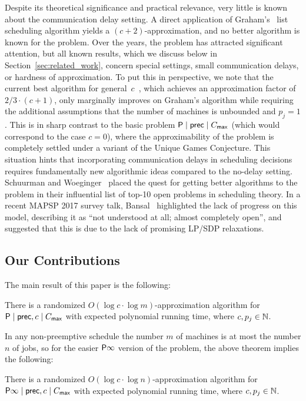Despite its theoretical significance and practical relevance, very little is known about the communication delay setting.
A direct application of Graham's~\cite{GrahamListScheduling1966} list scheduling algorithm yields a $(c+2)$-approximation,
and no better algorithm is known for the problem.
Over the years, the problem has attracted significant attention, but all known results,
which we discuss below in Section~\ref{sec:related_work}, concern special settings, small communication delays, or hardness of approximation. 
To put this in perspective, we note that the current best algorithm for general~$c$~\cite{GiroudeauKMP08}, which achieves an approximation factor of $2/3 \cdot (c+1)$, only marginally improves on Graham's algorithm while requiring the additional assumptions that the number of machines is unbounded and $p_j = 1$.
This is in sharp contrast to the basic problem  $\mathsf{P} \mid \mathsf{prec} \mid C_{\mathsf{max}}$ (which would correspond to the case $c=0$), where the approximability of the problem is completely settled under a variant of the Unique Games Conjecture.
This situation hints that incorporating communication delays in scheduling  decisions requires fundamentally new algorithmic ideas compared to the no-delay setting.
Schuurman and Woeginger~\cite{SW99a} placed the quest for getting better algorithms to the problem in their influential list of top-10 open problems in scheduling theory.
In a recent MAPSP 2017 survey talk,  Bansal~\cite{Bansalmapsp} highlighted the lack of progress on this model, describing it as ``not understood at all; almost completely open'', and suggested that this is due to the lack of promising LP/SDP relaxations.


\subsection{Our Contributions}

The main result of this paper is the following:

\begin{theorem} \label{thm:main_sched1}
There is a randomized $O(\log c \cdot \log m)$-approximation algorithm for $\mathsf{P} \mid \mathsf{prec}, c \mid C_{\mathsf{max}}$ with expected polynomial running time, where $c, p_j \in \mathbb{N}$.
\end{theorem}

In any non-preemptive schedule the number $m$ of machines is at most the number $n$ of jobs, so for the easier $\mathsf{P} \infty$ version of the problem, the above theorem implies the following:

\begin{corollary} \label{cor:colmain_sched1}
There is a randomized $O(\log c \cdot \log n)$-approximation algorithm for $\mathsf{P} \infty \mid \mathsf{prec}, c \mid C_{\mathsf{max}}$ with expected polynomial running time, where $c, p_j \in \mathbb{N}$.
\end{corollary}

